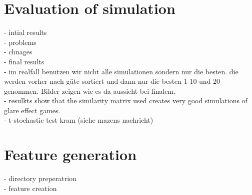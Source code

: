 \section{Evaluation of simulation}
- intial results\\
- problems\\
- chnages\\
- final results \\
- im realfall benutzen wir nicht alle simulationen sondern nur die besten. die werden vorher nach güte sortiert und dann nur die besten 1-10 und 20 genommen. Bilder zeigen wie es da aussieht bei finalem. \\
- resulkts show that the similarity matrix used creates very good simulations of glare effect games. \\
- t-stochastic test kram (siehe mazens nachricht)

\section{Feature generation}
- directory preperatrion\\
- feature creation\\
